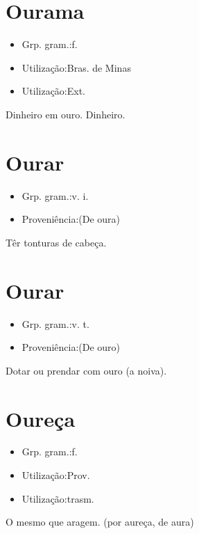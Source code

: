 \section{Ourama}
\begin{itemize}
\item {Grp. gram.:f.}
\end{itemize}
\begin{itemize}
\item {Utilização:Bras. de Minas}
\end{itemize}
\begin{itemize}
\item {Utilização:Ext.}
\end{itemize}
Dinheiro em ouro.
Dinheiro.
\section{Ourar}
\begin{itemize}
\item {Grp. gram.:v. i.}
\end{itemize}
\begin{itemize}
\item {Proveniência:(De \textunderscore oura\textunderscore )}
\end{itemize}
Têr tonturas de cabeça.
\section{Ourar}
\begin{itemize}
\item {Grp. gram.:v. t.}
\end{itemize}
\begin{itemize}
\item {Proveniência:(De \textunderscore ouro\textunderscore )}
\end{itemize}
Dotar ou prendar com ouro (a noiva).
\section{Oureça}
\begin{itemize}
\item {Grp. gram.:f.}
\end{itemize}
\begin{itemize}
\item {Utilização:Prov.}
\end{itemize}
\begin{itemize}
\item {Utilização:trasm.}
\end{itemize}
O mesmo que \textunderscore aragem\textunderscore .
(por \textunderscore aureça\textunderscore , de \textunderscore aura\textunderscore )
